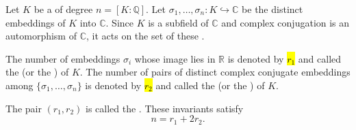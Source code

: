 \begin{definition} \label{definition:archimedean_invariants_of_a_number_field}
Let $K$ be a  of degree $n = [K : \mathbb{Q}]$. Let $\sigma_1, \ldots, \sigma_n : K \hookrightarrow \mathbb{C}$ be the distinct embeddings of $K$ into $\mathbb{C}$. Since $K$ is a subfield of $\mathbb{C}$ and complex conjugation is an automorphism of $\mathbb{C}$, it acts on the set of these .

The number of embeddings $\sigma_i$ whose image lies in $\mathbb{R}$ is denoted by \hl{$r_1$} and called the  (or the ) of $K$. The number of pairs of distinct complex conjugate embeddings among $\{\sigma_1, \ldots, \sigma_n\}$ is denoted by \hl{$r_2$} and called the  (or the ) of $K$.

The pair $(r_1, r_2)$ is called the . These invariants satisfy
$$n = r_1 + 2r_2.$$
\end{definition}
